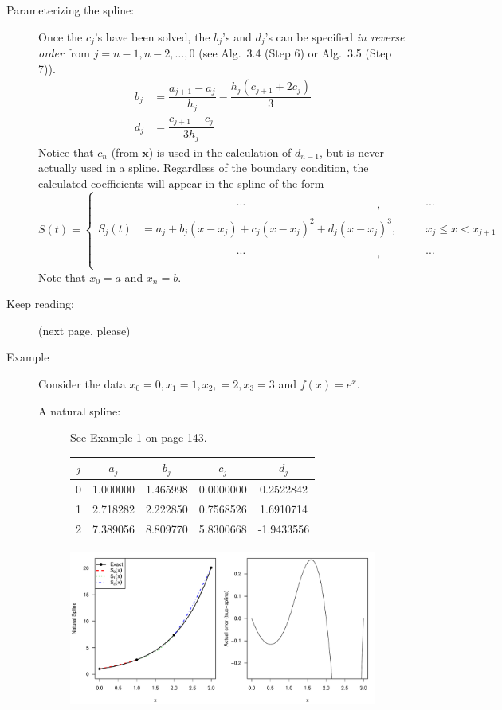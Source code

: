 \documentclass[11pt]{article}
\begin{document}
\begin{description}
\item[Parameterizing the spline:] Once the \(c_j\)'s have been solved, the \(b_j\)'s and \(d_j\)'s can be specified \textit{in reverse order} from \(j=n-1,n-2,\dots,0\) (see Alg.~3.4 (Step 6) or Alg.~3.5 (Step 7)).
\begin{align*}
b_j & = \dfrac{a_{j+1} - a_j}{h_j} - \dfrac{h_j(c_{j+1} + 2c_j)}{3}\\
d_j & = \dfrac{c_{j+1} - c_j}{3h_j}
\end{align*}
Notice that \(c_n\) (from \(\mathbf{x}\)) is used in the calculation of \(d_{n-1}\), but is never actually used in a spline. Regardless of the boundary condition, the calculated coefficients will appear in the spline of the form
%
\begin{equation*}
S(t) = \left\{\begin{alignedat}{2}
&\phantom{a_j + b_j(x-x_j) + } \cdots \phantom{(x-x_j)^2 + d_j(x-x_j)^3}, &&\cdots\\
S_j(t) &= a_j + b_j(x-x_j) + c_j(x-x_j)^2 + d_j(x-x_j)^3, \quad &&x_j\leq x < x_{j+1}\\
&\phantom{a_j + b_j(x-x_j) + } \cdots \phantom{(x-x_j)^2 + d_j(x-x_j)^3}, &&\cdots\\
\end{alignedat}\right.
\end{equation*}
%
Note that \(x_0=a\) and \(x_n=b\).
\item[Keep reading:] (next page, please)
\newpage

\item[Example] Consider the data \(x_0 = 0, x_1=1, x_2, =2, x_3=3\) and \(f(x) = e^x\). 

\begin{description}
\item[A natural spline:] See Example 1 on page 143.
\begin{center}
\begin{tabular}{c|cccc}
\(j\) & \(a_j\) & \(b_j\) & \(c_j\) & \(d_j\)\\
\hline
\hline
0 & 1.000000 & 1.465998 & 0.0000000 & 0.2522842\\
1 & 2.718282 & 2.222850 & 0.7568526 & 1.6910714\\
2 & 7.389056 & 8.809770 & 5.8300668 & -1.9433556
\end{tabular}

\includegraphics[width=0.9\textwidth]{2_interpolation/natural.pdf}
\end{center}


\end{description}
\end{description}
\end{document}
